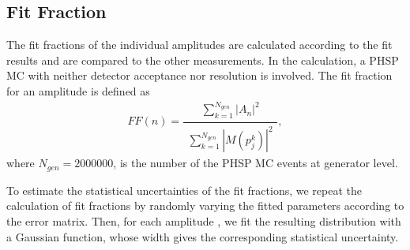 \subsection{Fit Fraction}
\label{FF}
\par{
The fit fractions of the individual amplitudes are calculated according to the fit results and are compared to the other measurements. In the calculation, a PHSP MC with neither detector acceptance nor resolution is involved. The fit fraction for an amplitude is defined as
    \begin{equation}
    FF(n) = \frac{\begin{matrix}\sum_{k=1}^{N_{gen}} \left|A_{n}\right|^{2}\end{matrix}}{\begin{matrix}\sum_{k=1}^{N_{gen}} \left|M(p_{j}^{k})\right|^{2}\end{matrix}}, \label{Fit-Fraction-Definition}
    \end{equation}
    where $N_{gen} = 2000000$, is the number of the PHSP MC events at generator level. 

    To estimate the statistical uncertainties of the fit fractions, we repeat the calculation of fit fractions by randomly varying the fitted parameters according to the error matrix. 
    Then, for each amplitude , we fit the resulting distribution with a Gaussian function, whose width gives the corresponding statistical uncertainty.
}

